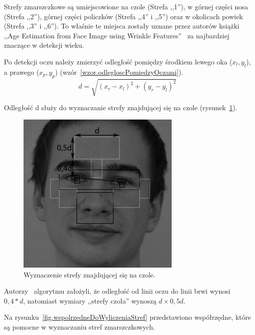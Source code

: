 \documentclass[a4paper,twoside,12pt]{book}
\begin{document}
    Strefy zmarszczkowe są umiejscowione na czole (Strefa ,,1''), w górnej części nosa (Strefa ,,2''), górnej części policzków
    (Strefa ,,4'' i ,,5'') oraz w okolicach powiek (Strefa ,,3'' i ,,6'').
    To właśnie te miejsca zostały uznane przez autorów książki ,,Age Estimation from Face Image using Wrinkle
    Features''~\cite{wrinkleFeatures} za najbardziej znaczące w detekcji wieku.

    Po detekcji oczu należy zmierzyć odległość pomiędzy środkiem lewego oka ($x_{l},y_{l}$),
    a prawego ($x_{p},y_{p}$)
    (wzór~\ref{wzor.odlegloscPomiedzyOczami}).
    \large
    \begin{equation}
        d= \sqrt{\left ( x_{r} - x_{l} \right )^{2}+\left (y_{r} - y_{l}  \right )^{2}}
        \label{wzor.odlegloscPomiedzyOczami}
    \end{equation}
    \normalsize

    Odległość d służy do wyznaczanie strefy znajdującej się na czole (rysunek~\ref{fig.wyznaczenieCzola}).


    \begin{figure}
        \centering
        \includegraphics[width=8cm]{Obrazy/wyliczenieCzolka.jpg}
        \caption{Wyznaczenie strefy znajdującej się na czole.}
        \label{fig.wyznaczenieCzola}
    \end{figure}

    Autorzy~\cite{wrinkleFeatures} algorytmu założyli, że odległość od linii oczu do linii brwi wynosi $0,4 * d$,
    natomiast wymiary ,,strefy czoła'' wynoszą $d \times 0,5d$.

    Na rysunku~\ref{fig.wspolrzedneDoWyliczeniaStref} przedstawiono współrzędne, które są pomocne w wyznaczaniu
    stref zmarszczkowych.
\end{document}

